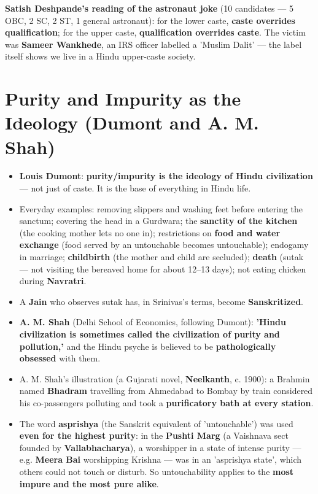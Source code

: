 \begin{ExampleBox}
\textbf{Satish Deshpande's reading of the astronaut joke} (10 candidates --- 5 OBC, 2 SC, 2 ST, 1 general astronaut): for the lower caste, \textbf{caste overrides qualification}; for the upper caste, \textbf{qualification overrides caste}. The victim was \textbf{Sameer Wankhede}, an IRS officer labelled a 'Muslim Dalit' --- the label itself shows we live in a Hindu upper-caste society.
\end{ExampleBox}

\section{Purity and Impurity as the Ideology (Dumont and A. M. Shah)}

\begin{KeyConcept}
\begin{itemize}
\item \textbf{Louis Dumont}: \textbf{purity/impurity is the ideology of Hindu civilization} --- not just of caste. It is the base of everything in Hindu life.
\item Everyday examples: removing slippers and washing feet before entering the sanctum; covering the head in a Gurdwara; the \textbf{sanctity of the kitchen} (the cooking mother lets no one in); restrictions on \textbf{food and water exchange} (food served by an untouchable becomes untouchable); endogamy in marriage; \textbf{childbirth} (the mother and child are secluded); \textbf{death} (sutak --- not visiting the bereaved home for about 12--13 days); not eating chicken during \textbf{Navratri}.
\item A \textbf{Jain} who observes sutak has, in Srinivas's terms, become \textbf{Sanskritized}.
\item \textbf{A. M. Shah} (Delhi School of Economics, following Dumont): \textbf{'Hindu civilization is sometimes called the civilization of purity and pollution,'} and the Hindu psyche is believed to be \textbf{pathologically obsessed} with them.
\end{itemize}
\end{KeyConcept}

\begin{ExampleBox}
\begin{itemize}
\item A. M. Shah's illustration (a Gujarati novel, \textbf{Neelkanth}, c. 1900): a Brahmin named \textbf{Bhadram} travelling from Ahmedabad to Bombay by train considered his co-passengers polluting and took a \textbf{purificatory bath at every station}.
\item The word \textbf{asprishya} (the Sanskrit equivalent of 'untouchable') was used \textbf{even for the highest purity}: in the \textbf{Pushti Marg} (a Vaishnava sect founded by \textbf{Vallabhacharya}), a worshipper in a state of intense purity --- e.g. \textbf{Meera Bai} worshipping Krishna --- was in an 'asprishya state', which others could not touch or disturb. So untouchability applies to the \textbf{most impure and the most pure alike}.
\end{itemize}
\end{ExampleBox}

